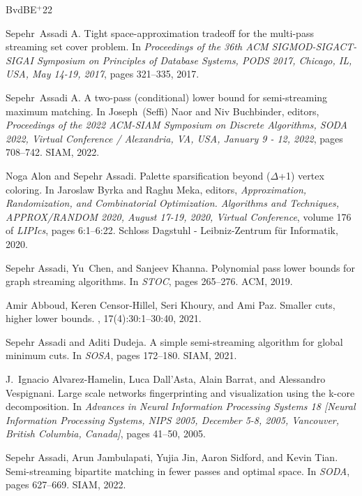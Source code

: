 \documentclass[11pt,letterpaper]{article}
\theoremstyle{definition}
\begin{document}
\newcommand{\etalchar}[1]{$^{#1}$}
\begin{thebibliography}{BvdBE{\etalchar{+}}22}

Sepehr~Assadi A.
\newblock Tight space-approximation tradeoff for the multi-pass streaming set cover problem.
\newblock In {\em Proceedings of the 36th {ACM} {SIGMOD-SIGACT-SIGAI} Symposium on Principles of Database Systems, {PODS} 2017, Chicago, IL, USA, May 14-19, 2017}, pages 321--335, 2017.

Sepehr~Assadi A.
\newblock A two-pass (conditional) lower bound for semi-streaming maximum matching.
\newblock In Joseph~(Seffi) Naor and Niv Buchbinder, editors, {\em Proceedings of the 2022 {ACM-SIAM} Symposium on Discrete Algorithms, {SODA} 2022, Virtual Conference / Alexandria, VA, USA, January 9 - 12, 2022}, pages 708--742. {SIAM}, 2022.

Noga Alon and Sepehr Assadi.
\newblock Palette sparsification beyond ({\(\Delta\)}+1) vertex coloring.
\newblock In Jaroslaw Byrka and Raghu Meka, editors, {\em Approximation, Randomization, and Combinatorial Optimization. Algorithms and Techniques, {APPROX/RANDOM} 2020, August 17-19, 2020, Virtual Conference}, volume 176 of {\em LIPIcs}, pages 6:1--6:22. Schloss Dagstuhl - Leibniz-Zentrum f{\"{u}}r Informatik, 2020.

Sepehr Assadi, Yu~Chen, and Sanjeev Khanna.
\newblock Polynomial pass lower bounds for graph streaming algorithms.
\newblock In {\em {STOC}}, pages 265--276. {ACM}, 2019.

Amir Abboud, Keren Censor{-}Hillel, Seri Khoury, and Ami Paz.
\newblock Smaller cuts, higher lower bounds.
, 17(4):30:1--30:40, 2021.

Sepehr Assadi and Aditi Dudeja.
\newblock A simple semi-streaming algorithm for global minimum cuts.
\newblock In {\em {SOSA}}, pages 172--180. {SIAM}, 2021.

J.~Ignacio Alvarez{-}Hamelin, Luca Dall'Asta, Alain Barrat, and Alessandro Vespignani.
\newblock Large scale networks fingerprinting and visualization using the k-core decomposition.
\newblock In {\em Advances in Neural Information Processing Systems 18 [Neural Information Processing Systems, {NIPS} 2005, December 5-8, 2005, Vancouver, British Columbia, Canada]}, pages 41--50, 2005.

\bibitem[AJJ{\etalchar{+}}22]{AssadiJJST22}
Sepehr Assadi, Arun Jambulapati, Yujia Jin, Aaron Sidford, and Kevin Tian.
\newblock Semi-streaming bipartite matching in fewer passes and optimal space.
\newblock In {\em {SODA}}, pages 627--669. {SIAM}, 2022.


\end{thebibliography}
\end{document}
